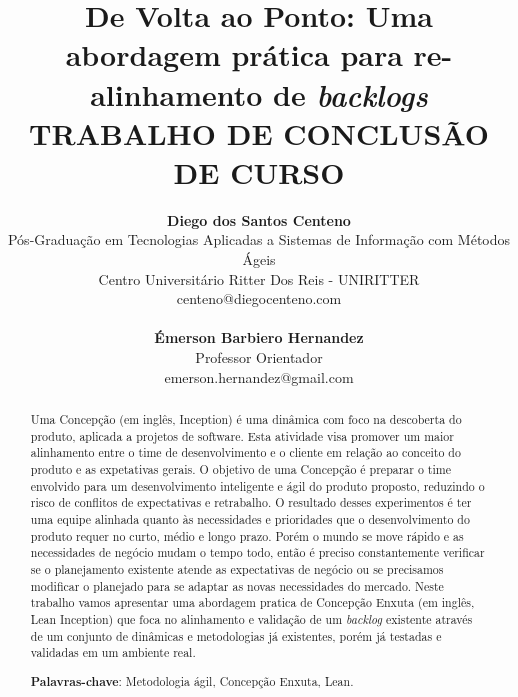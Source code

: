\documentclass[10pt]{article}
\begin{document}
\title{
    De Volta ao Ponto: Uma abordagem prática para re-alinhamento de \textit{backlogs}\\ \smallskip
    \small{TRABALHO DE CONCLUSÃO DE CURSO}
}

\author{
 	{\bf Diego dos Santos Centeno }\\ 
 	{\normalsize Pós-Graduação em Tecnologias Aplicadas a Sistemas de Informação com Métodos Ágeis} \\
 	{\normalsize Centro Universitário Ritter Dos Reis - UNIRITTER} \\
 	{\normalsize centeno@diegocenteno.com}  \\ \\
 	{\bf Émerson Barbiero Hernandez} \\
 	{\normalsize Professor Orientador}\\
 	{\normalsize emerson.hernandez@gmail.com} \\
}
\maketitle


\begin{abstract}
\maketitle
\noindent
\small
Uma Concepção (em inglês, Inception) é uma dinâmica com foco na descoberta do produto, aplicada a projetos de software. Esta atividade visa promover um maior alinhamento entre o time de desenvolvimento e o cliente em relação ao conceito do produto e as expetativas gerais. O objetivo de uma Concepção é preparar o time envolvido para um desenvolvimento inteligente e ágil do produto proposto, reduzindo o risco de conflitos de expectativas e retrabalho. O resultado desses experimentos é ter uma equipe alinhada quanto às necessidades e prioridades que o desenvolvimento do produto requer no curto, médio e longo prazo.
Porém o mundo se move rápido e as necessidades de negócio mudam o tempo todo, então é preciso constantemente verificar se o planejamento existente atende as expectativas de negócio ou se precisamos modificar o planejado para se adaptar as novas necessidades do mercado.
Neste trabalho vamos apresentar uma abordagem pratica de Concepção Enxuta (em inglês, Lean Inception) que foca no alinhamento e validação de um \textit{backlog} existente através de um conjunto de dinâmicas e metodologias já existentes, porém já testadas e validadas em um ambiente real.

\noindent
\textbf{Palavras-chave}: Metodologia ágil, Concepção Enxuta, Lean.
\end{abstract}
\end{document}
